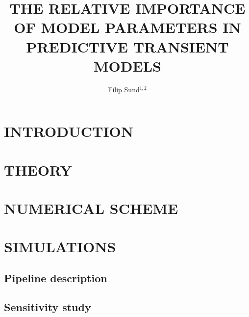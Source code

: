 \documentclass{mekit17}
\title{THE RELATIVE IMPORTANCE OF MODEL PARAMETERS IN PREDICTIVE TRANSIENT MODELS}
\author{Filip Sund$^{1,2}$}
\begin{document}



\section{INTRODUCTION}


\section{THEORY}
\label{theory}


\section{NUMERICAL SCHEME}



\section{SIMULATIONS}
\label{simulations}
\subsection{Pipeline description}
\label{subsec:pipeline}

\subsection{Sensitivity study}

\end{document}
